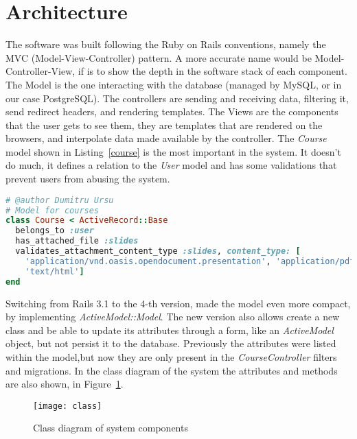 
\section{Architecture}
\label{sec:Architecture}
The software was built following the Ruby on Rails conventions, namely the MVC (Model-View-Controller)
pattern. A more accurate name would be Model-Controller-View, if is to show the
depth in the software stack of each component. The Model is the one interacting with the
database (managed by MySQL, or in our case PostgreSQL). The controllers are sending and
receiving data, filtering it, send redirect headers, and rendering templates. The Views
are the components that the user gets to see them, they are templates that are rendered
on the browsers, and interpolate data made available by the controller.
The \textit{Course} model shown in Listing~\ref{course} is the most important in the system.
It doesn't do much, it defines a relation to the \textit{User} model and has some validations
that prevent users from abusing the system.
\begin{lstlisting}[language=Ruby, caption={Course Model}, label=course]
# @author Dumitru Ursu
# Model for courses
class Course < ActiveRecord::Base
  belongs_to :user
  has_attached_file :slides
  validates_attachment_content_type :slides, content_type: [
    'application/vnd.oasis.opendocument.presentation', 'application/pdf',
    'text/html']
end
\end{lstlisting}
Switching from Rails 3.1 to the 4-th version, made the model even more compact, by implementing
\textit{ActiveModel::Model}. The new version also allows create a new class and be able to update its attributes through a form,
like an \textit{ActiveModel} object, but not persist it to the database.
Previously the attributes were listed within the model,but now they are only present in the
\textit{CourseController} filters and migrations. In the class diagram of the system the attributes
and methods are also shown, in Figure~\ref{fig:Class Diagram}.
\begin{figure}[ht!]
    \centering
    \texttt{[image: class]}
    \caption{Class diagram of system components}
    \label{fig:Class Diagram}
\end{figure}


